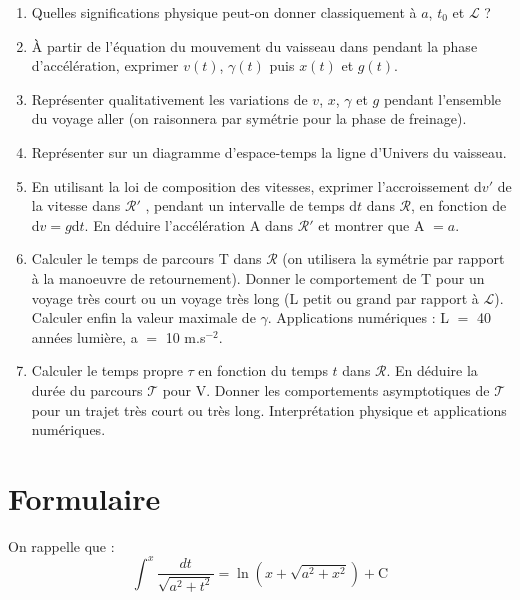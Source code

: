 \begin{enumerate}
  \item Quelles significations physique peut-on donner classiquement à $a$, $t_0$ et $\mathcal{L}$ ?
  \item À partir de l’équation du mouvement du vaisseau dans  pendant la phase d’accélération,
exprimer $v(t)$, $\gamma(t)$ puis $x(t)$ et $g(t)$.
  \item Représenter qualitativement les variations de $v$, $x$, $\gamma$ et $g$ pendant l’ensemble du voyage
aller (on raisonnera par symétrie pour la phase de freinage).
  \item Représenter sur un diagramme d’espace-temps la ligne d’Univers du vaisseau.
  \item En utilisant la loi de composition des vitesses, exprimer l’accroissement d$v'$ de la vitesse
dans $\mathcal{R}'$ , pendant un intervalle de temps d$t$ dans $\mathcal{R}$, en fonction de d$v = g$d$t$. En déduire
l’accélération A dans $\mathcal{R}'$ et montrer que A $= a$.
  \item Calculer le temps de parcours T dans $\mathcal{R}$ (on utilisera la symétrie par rapport à la manoeuvre
de retournement). Donner le comportement de T pour un voyage très court ou un voyage
très long (L petit ou grand par rapport à $\mathcal{L}$). Calculer enfin la valeur maximale de $\gamma$.
Applications numériques : L $=$ 40 années lumière, a $=$ 10 m.s$^{−2}$.
  \item Calculer le temps propre $\tau$ en fonction du temps $t$ dans $\mathcal{R}$. En déduire la durée du parcours
$\mathcal{T}$ pour V. Donner les comportements asymptotiques de $\mathcal{T}$ pour un trajet très court ou
très long. Interprétation physique et applications numériques.
\end{enumerate}
\section{Formulaire}%
On rappelle que :
\[
\int^x\frac{dt}{\sqrt{a^2+t^2}} = \ln(x+\sqrt{a^2+x^2})+\text{C}
\]
